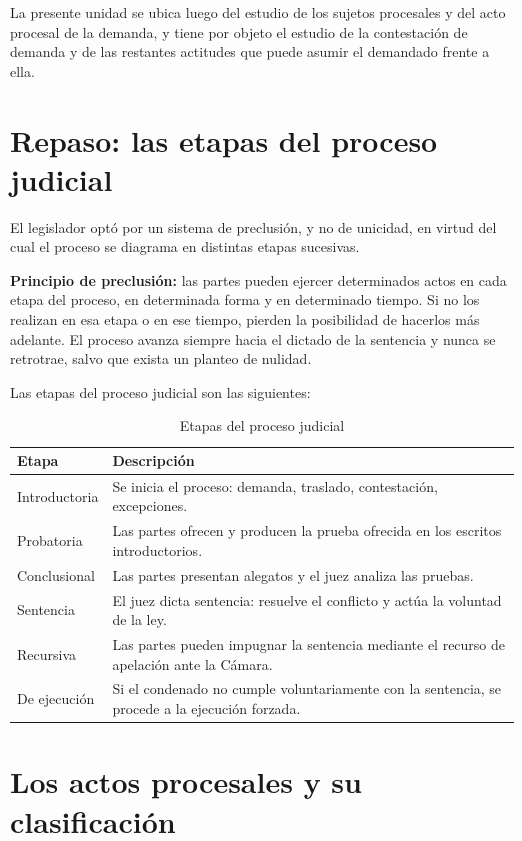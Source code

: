 \documentclass[12pt,oneside]{book}
\begin{document}
La presente unidad se ubica luego del estudio de los sujetos procesales y del acto procesal de la demanda, y tiene por objeto el estudio de la contestación de demanda y de las restantes actitudes que puede asumir el demandado frente a ella.

\section{Repaso: las etapas del proceso judicial}

El legislador optó por un sistema de preclusión, y no de unicidad, en virtud del cual el proceso se diagrama en distintas etapas sucesivas.

\begin{important}
\textbf{Principio de preclusión:} las partes pueden ejercer determinados actos en cada etapa del proceso, en determinada forma y en determinado tiempo. Si no los realizan en esa etapa o en ese tiempo, pierden la posibilidad de hacerlos más adelante. El proceso avanza siempre hacia el dictado de la sentencia y nunca se retrotrae, salvo que exista un planteo de nulidad.
\end{important}

Las etapas del proceso judicial son las siguientes:

\begin{table}[H]
\centering
\caption{Etapas del proceso judicial}
\begin{tabularx}{\textwidth}{l X}
\toprule
\textbf{Etapa} & \textbf{Descripción} \\
\midrule
Introductoria & Se inicia el proceso: demanda, traslado, contestación, excepciones. \\
Probatoria & Las partes ofrecen y producen la prueba ofrecida en los escritos introductorios. \\
Conclusional & Las partes presentan alegatos y el juez analiza las pruebas. \\
Sentencia & El juez dicta sentencia: resuelve el conflicto y actúa la voluntad de la ley. \\
Recursiva & Las partes pueden impugnar la sentencia mediante el recurso de apelación ante la Cámara. \\
De ejecución & Si el condenado no cumple voluntariamente con la sentencia, se procede a la ejecución forzada. \\
\bottomrule
\end{tabularx}
\end{table}

\section{Los actos procesales y su clasificación}
\end{document}
